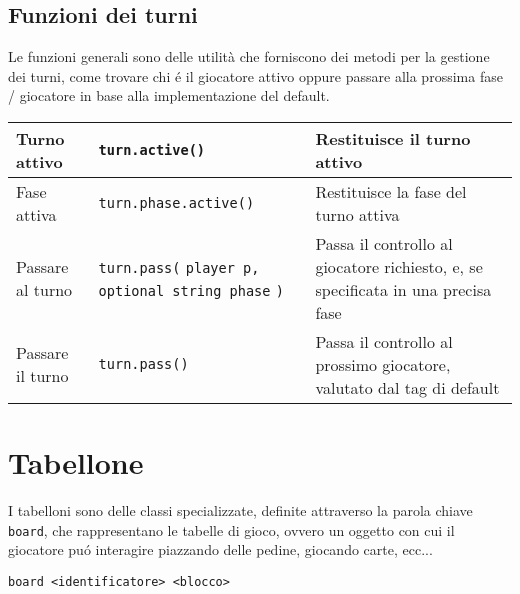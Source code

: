 \subsection{Funzioni dei turni}
Le funzioni generali sono delle utilità che forniscono dei metodi per la gestione
dei turni, come trovare chi é il giocatore attivo oppure passare alla prossima 
fase / giocatore in base alla implementazione del default. \\

\begin{center}
\begin{tabularx}{\linewidth}{|l|p{6cm}|X|}
   \hline 
   Turno attivo & \lstinline|turn.active()| & Restituisce il turno attivo \\
   \hline
   Fase attiva & \lstinline|turn.phase.active()| & Restituisce la fase del turno attiva \\
   \hline
   Passare al turno &
    \lstinline|turn.pass(|\newline
    \lstinline|player p,|\newline
    \lstinline[keepspaces]|optional string phase|\newline
    \lstinline|)|
    &
   Passa il controllo al giocatore richiesto,
   e, se specificata in una precisa fase \\
   \hline
   Passare il turno & \lstinline|turn.pass()| & Passa il controllo al prossimo giocatore, 
   valutato dal tag di default \\
   \hline 
\end{tabularx}
\end{center}

\section{Tabellone}
I tabelloni sono delle classi specializzate, definite attraverso la parola chiave \lstinline|board|,
che rappresentano le tabelle di gioco, ovvero un oggetto con cui
il giocatore puó interagire piazzando delle pedine, giocando carte, ecc... \\ 
\begin{lstlisting}
board <identificatore> <blocco>
\end{lstlisting}

